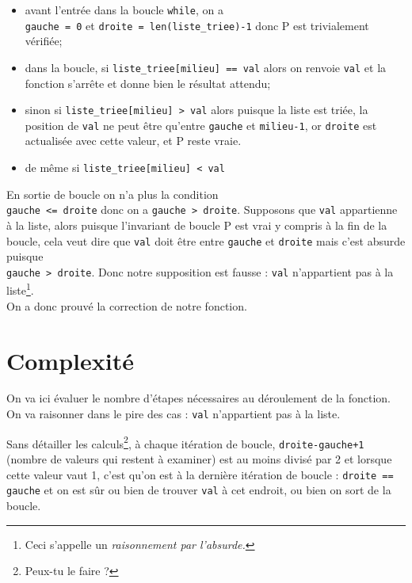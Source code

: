 \begin{itemize}
    \item   avant l'entrée dans la boucle \texttt{while}, on a\\
     \texttt{gauche = 0} et \texttt{droite = len(liste_triee)-1} donc P est trivialement vérifiée;
    \item   dans la boucle, si  \texttt{liste_triee[milieu] == val} alors on renvoie \texttt{val} et la fonction s'arrête et donne bien le résultat attendu;
    \item   sinon si \texttt{liste_triee[milieu] > val} alors puisque la liste est triée, la position de \texttt{val} ne peut être qu'entre \texttt{gauche} et \texttt{milieu-1}, or \texttt{droite} est actualisée avec cette valeur, et P reste vraie.
    \item   de même si \texttt{liste_triee[milieu] < val}
\end{itemize}
En sortie de boucle on n'a plus la condition \\
\texttt{gauche <= droite} donc on a \texttt{gauche > droite}. Supposons que \texttt{val} appartienne à la liste, alors puisque l'invariant de boucle P est vrai y compris à la fin de la boucle, cela veut dire que \texttt{val} doit être entre \texttt{gauche} et \texttt{droite} mais c'est absurde puisque\\  \texttt{gauche > droite}. Donc notre supposition est fausse : \texttt{val} n'appartient pas à la liste\footnote{Ceci s'appelle un \textit{raisonnement par l'absurde.}}.\\

On a donc prouvé la correction de notre fonction.

\section{Complexité}

On va ici évaluer le nombre d'étapes nécessaires au déroulement de la fonction. On va raisonner dans le pire des cas : \texttt{val} n'appartient pas à la liste.

Sans détailler les calculs\footnote{Peux-tu le faire ?}, à chaque itération de boucle, \texttt{droite-gauche+1} (nombre de valeurs qui restent à examiner) est au moins divisé par 2 et lorsque  cette valeur vaut 1, c'est qu'on est à la dernière itération de boucle : \texttt{droite == gauche} et on est sûr ou bien de trouver \texttt{val} à cet endroit, ou bien on sort de la boucle.\\

